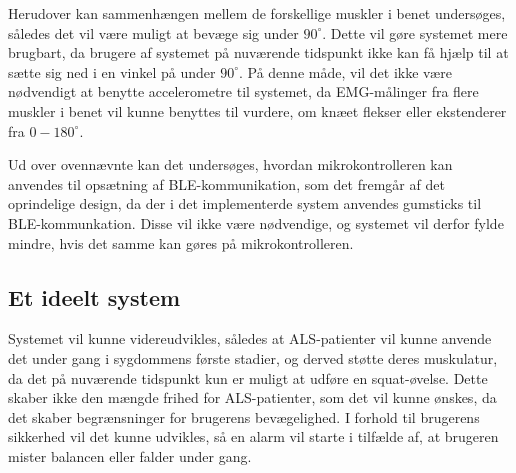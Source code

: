 \noindent
Herudover kan sammenhængen mellem de forskellige muskler i benet undersøges, således det vil være muligt at bevæge sig under $90^{\circ}$. Dette vil gøre systemet mere brugbart, da brugere af systemet på nuværende tidspunkt ikke kan få hjælp til at sætte sig ned i en vinkel på under $90^{\circ}$. På denne måde, vil det ikke være nødvendigt at benytte accelerometre til systemet, da EMG-målinger fra flere muskler i benet vil kunne benyttes til vurdere, om knæet flekser eller ekstenderer fra $0-180^{\circ}$.

Ud over ovennævnte kan det undersøges, hvordan mikrokontrolleren kan anvendes til opsætning af BLE-kommunikation, som det fremgår af det oprindelige design, da der i det implementerde system anvendes gumsticks til BLE-kommunkation. Disse vil ikke være nødvendige, og systemet vil derfor fylde mindre, hvis det samme kan gøres på mikrokontrolleren. 

\subsection{Et ideelt system}
Systemet vil kunne videreudvikles, således at ALS-patienter vil kunne anvende det under gang i sygdommens første stadier, og derved støtte deres muskulatur, da det på nuværende tidspunkt kun er muligt at udføre en squat-øvelse. Dette skaber ikke den mængde frihed for ALS-patienter, som det vil kunne ønskes, da det skaber begrænsninger for brugerens bevægelighed. I forhold til brugerens sikkerhed vil det kunne udvikles, så en alarm vil starte i tilfælde af, at brugeren mister balancen eller falder under gang. %




